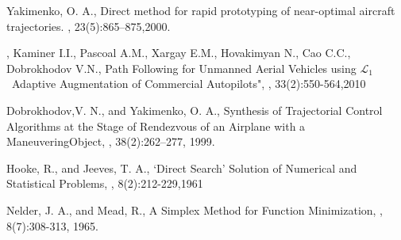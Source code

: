 \documentclass[]{aiaa-tc}%
\begin{document}
\begin{thebibliography}{9}%
    Yakimenko, O. A.,
    \newblock Direct method for rapid prototyping of near-optimal aircraft trajectories.
    , 23(5):865--875,2000.

,
    Kaminer I.I., Pascoal A.M., Xargay E.M., Hovakimyan N., Cao C.C., Dobrokhodov V.N.,
    \newblock Path Following for Unmanned Aerial Vehicles using {$\mathcal{L}_1$}~Adaptive Augmentation of Commercial Autopilots",
    , 33(2):550-564,2010

    Dobrokhodov,V. N., and Yakimenko, O. A.,
    \newblock Synthesis of Trajectorial Control Algorithms at the Stage of Rendezvous of an Airplane with a ManeuveringObject,
    , 38(2):262–277, 1999.

    Hooke, R., and Jeeves, T. A.,
    \newblock ‘Direct Search’ Solution of Numerical and Statistical Problems,
    , 8(2):212-229,1961

    Nelder, J. A., and Mead, R.,
    \newblock A Simplex Method for Function Minimization,
    , 8(7):308-313, 1965.
\end{thebibliography}
\end{document}
